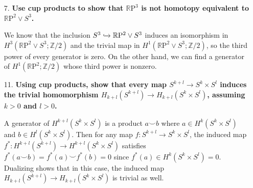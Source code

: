\documentclass[12pt]{article}
\newcommand{\inc}{\xhookrightarrow{}}
\newcommand{\RP}{\mathbb{R}\mathrm{P}}
\begin{document}
\begin{enumerate}
    \item[7.]
        \boldmath\textbf{Use cup products to show that $\RP^3$ is not homotopy equivalent to $\RP^2 \vee S^3$.
        }\unboldmath \par
        We know that the inclusion $S^3 \inc \RP^2 \vee S^3$ induces an isomorphism in $H^3(\RP^2 \vee S^3; \mathbb{Z}/2)$ and the trivial map in $H^1(\RP^2 \vee S^3; \mathbb{Z}/2)$, so the third power of every generator is zero. On the other hand, we can find a generator of $H^1(\RP^2; \mathbb{Z}/2)$ whose third power is nonzero.

    \item[11.]
        \boldmath\textbf{Using cup products, show that every map $S^{k + l} \to S^k \times S^l$ induces the trivial homomorphism $H_{k + l}(S^{k + l}) \to H_{k + l}(S^k \times S^l)$, assuming $k > 0$ and $l > 0$.
        }\unboldmath \par
        A generator of $H^{k + l}(S^k \times S^l)$ is a product $a \smile b$ where $a \in H^k(S^k \times S^l)$ and $b \in H^l(S^k \times S^l)$. Then for any map $f : S^{k + l} \to S^k \times S^l$, the induced map $f^* : H^{k + l}(S^{k + l}) \to H^{k + l}(S^k \times S^l)$ satisfies $f^*(a \smile b) = f^*(a) \smile f^*(b) = 0$ since $f^*(a) \in H^k(S^k \times S^l) = 0$. Dualizing shows that in this case, the induced map $H_{k + l}(S^{k + l}) \to H_{k + l}(S^k \times S^l)$ is trivial as well.
\end{enumerate}
\end{document}
